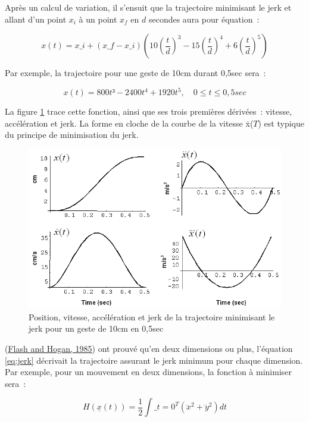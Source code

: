 \documentclass[
]{book}
\begin{document}
Après un calcul de variation, il s'ensuit que la trajectoire minimisant le
jerk et allant d'un point \(x_i\) à un point \(x_f\) en \(d\) secondes aura pour
équation~:

\begin{equation}
 x(t)=x\_{i}+\left(x\_{f}-x\_{i}\right)\left(10\left(\frac{t}{d}\right)^{3}-15\left(\frac{t}{d}\right)^{4}+6\left(\frac{t}{d}\right)^{5}\right)
 \label{eq:jerk}
\end{equation}

Par exemple, la trajectoire pour une geste de 10cm durant 0,5sec
sera~:

\[ x(t)=800t³-2400t^{4}+1920t^{5},\quad0\leq t\leq0,5sec\]

La figure \ref{fig:Positionvitesseacceleration}
trace cette fonction, ainsi que ses trois premières dérivées~: vitesse,
accélération et jerk. La forme en cloche de la courbe de la vitesse
ẋ(\(T\)) est typique du principe de minimisation du
jerk.

\begin{figure}
\centering
\includegraphics{img/minimu2.png}
\caption{\label{fig:Positionvitesseacceleration}Position, vitesse,
accélération et jerk de la trajectoire minimisant le jerk pour un
geste de 10cm en 0,5sec}
\end{figure}

(\protect\hyperlink{ref-flash1985coordination}{Flash and Hogan, 1985}) ont prouvé qu'en
deux dimensions ou plus, l'équation \eqref{eq:jerk} décrivait la trajectoire
assurant le jerk minimum pour chaque dimension. Par exemple, pour un
mouvement en deux dimensions, la fonction à minimiser sera~:

\[
 H\left(\underline{x}(t)\right)=\frac{1}{2}\int\_{t=0}^{T}\left(\dddot{x}^{2}+\dddot{y}^{2}\right)dt\]
\end{document}
